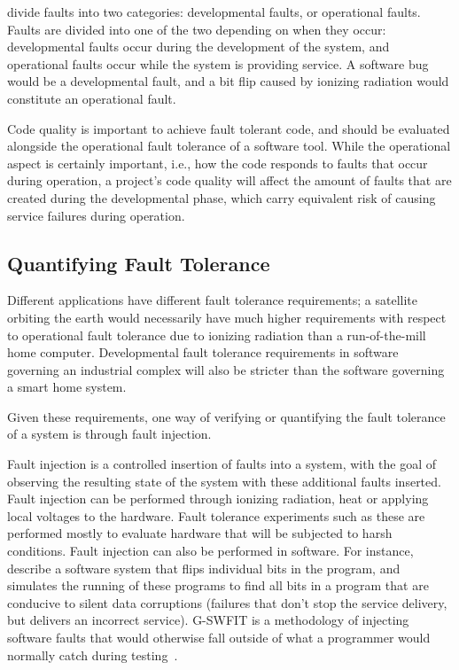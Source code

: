 \citet{avizienis2004basic} divide faults into two categories: developmental faults, or operational faults. Faults are divided into one of the two depending on when they occur: developmental faults occur during the development of the system, and operational faults occur while the system is providing service. A software bug would be a developmental fault, and a bit flip caused by ionizing radiation would constitute an operational fault.



Code quality is important to achieve fault tolerant code, and should be evaluated alongside the operational fault tolerance of a software tool. While the operational aspect is certainly important, i.e., how the code responds to faults that occur during operation, a project's code quality will affect the amount of faults that are created during the developmental phase, which carry equivalent risk of causing service failures during operation. 


\subsection{Quantifying Fault Tolerance}
\label{section:Verifying_fault_tolerance}

Different applications have different fault tolerance requirements; a satellite orbiting the earth would necessarily have much higher requirements with respect to operational fault tolerance due to ionizing radiation than a run-of-the-mill home computer. Developmental fault tolerance requirements in software governing an industrial complex will also be stricter than the software governing a smart home system. 

Given these requirements, one way of verifying or quantifying the fault tolerance of a system is through fault injection.

Fault injection is a controlled insertion of faults into a system, with the goal of observing the resulting state of the system with these additional faults inserted. Fault injection can be performed through ionizing radiation, heat or applying local voltages to the hardware. Fault tolerance experiments such as these are performed mostly to evaluate hardware that will be subjected to harsh conditions. 
Fault injection can also be performed in software. For instance,~\citet{venkatagiri2019gem5} describe a software system that flips individual bits in the program, and simulates the running of these programs to find all bits in a program that are conducive to silent data corruptions (failures that don't stop the service delivery, but delivers an incorrect service).  G-SWFIT is a methodology of injecting software faults that would otherwise fall outside of what a programmer would normally catch during testing~\citep{natella2012fault}.

